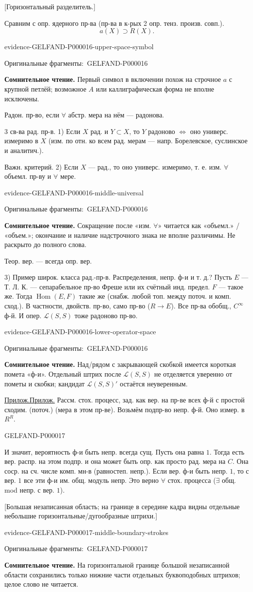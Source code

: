 \documentclass[11pt]{article}
\let\MathUnderline\underline
\renewcommand{\underline}[1]{\ifmmode\MathUnderline{#1}\else\uline{#1}\fi}
\newcommand{\SourcePage}[2]{\par\smallskip\phantomsection\label{#1:source-page}{\small\sffamily\color{blue!55!black}#1}\par\smallskip}
\newcommand{\EvidenceBlock}[4]{%
 \par\smallskip\noindent\begin{minipage}{\linewidth}
 \begin{minipage}[t]{.47\linewidth}\vspace{0pt}\centering
 \csname evidence-#1-#2\endcsname\par
 {\scriptsize\SourceCropCaption\ #1}\par
 \end{minipage}\hfill
 \begin{minipage}[t]{.49\linewidth}\vspace{0pt}\raggedright
 {\small\color{orange!65!black}\textbf{#4} #3}\par
 \end{minipage}
 \end{minipage}\par\smallskip}
\newcommand{\Unclear}[3]{\EvidenceBlock{#1}{#2}{#3}{\ReadingCaption}}
\newcommand{\SourceCropCaption}{Оригинальные фрагменты:}\newcommand{\ReadingCaption}{Сомнительное чтение.}\newcommand{\IncompleteCaption}{Неразобранный фрагмент.}\newcommand{\DiagramCaption}{Рисунок и набранное описание.}
\begin{document}
[Горизонтальный разделитель.]

Сравним с опр. ядерного пр-ва (пр-ва в к-рых 2 опр. тенз. произв. совп.).
\begin{equation*}
a(X)\supset R(X).
\end{equation*}
\Unclear{GELFAND-P000016}{upper-space-symbol}{Первый символ в включении похож на строчное $a$ с крупной петлёй; возможное $A$ или каллиграфическая форма не вполне исключены.}
Радон. пр-во, если $\forall$ абстр. мера на нём --- радонова.

3 св-ва рад. пр-в.
1) Если $X$ рад. и $Y\subset X$, то $Y$ радоново $\Longleftrightarrow$ оно универс. измеримо в $X$
(изм. по отн. ко всем рад. мерам --- напр. Борелевское, суслинское и аналитич.).

Важн. критерий.
2) Если $X$ --- рад., то оно универс. измеримо, т. е. изм. $\forall$ объемл. пр-ву и $\forall$ мере.
\Unclear{GELFAND-P000016}{middle-universal}{Сокращение после «изм. \(\forall\)» читается как «объемл.» / «объем.»; окончание и наличие надстрочного знака не вполне различимы. Не раскрыто до полного слова.}
Теор. вер. --- всегда опр. вер.

3) Пример широк. класса рад.-пр-в.
Распределения, непр. ф-и и т. д.?
Пусть $E$ --- Т. Л. К. --- сепарабельное пр-во Фреше или их счётный инд. предел.
$F$ --- такое же.
Тогда $\operatorname{Hom}(E,F)$ такие же (снабж. любой топ. между поточ. и комп. сход.).
В частности, двойств. пр-во, само пр-во ($R\longrightarrow E$).
Все пр-ва обобщ., $C^\infty$ ф-й.
И опер. $\mathcal L(S,S)$ тоже радоново пр-во.
\Unclear{GELFAND-P000016}{lower-operator-space}{Над/рядом с закрывающей скобкой имеется короткая помета «ф-и». Отдельный штрих после $\mathcal L(S,S)$ не отделяется уверенно от пометы и скобки; кандидат $\mathcal L(S,S)'$ остаётся неуверенным.}

\underline{Прилож.} Рассм. стох. процесс, зад. как вер. на пр-ве всех ф-й с простой сходим. (поточ.) (мера в этом пр-ве).
Возьмём подпр-во непр. ф-й. Оно измер. в $R^R$.



\SourcePage{GELFAND-P000017}{9}
И значит, вероятность ф-и быть непр. всегда сущ.
Пусть она равна $1$. Тогда есть вер. распр. на этом подпр. и она может быть опр. как просто рад. мера на $C$.
Она соср. на сч. числе комп. мн-в (равностеп. непр.).
Если вер. ф-и быть непр. $1$, то с вер. $1$ все эти ф-и им. общ. модуль непр.
Это верно $\forall$ стох. процесса ($\exists$ общ. mod непр. с вер. $1$).

[Большая незаписанная область; на границе в середине кадра видны отдельные небольшие горизонтальные/дугообразные штрихи.]
\Unclear{GELFAND-P000017}{middle-boundary-strokes}{На горизонтальной границе большой незаписанной области сохранились только нижние части отдельных буквоподобных штрихов; целое слово не читается.}
\end{document}
